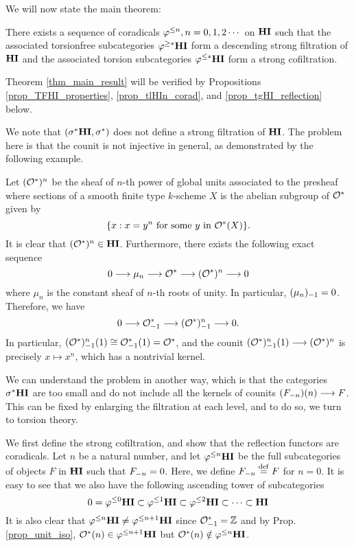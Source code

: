 We will now state the main theorem:

\begin{thm}\label{thm_main_result}
There exists a sequence of coradicals $\tlHI{n}, n = 0, 1, 2 
\cdots$ on $\HI$ such that the associated torsionfree 
subcategories $\tgHI{*}\HI$ form a descending strong filtration
of $\HI$ and the associated torsion subcategories $\tlHI{*}\HI$ 
form a strong cofiltration.
\end{thm}

Theorem \ref{thm_main_result} will be verified by Propositions
\ref{prop_TFHI_properties}, \ref{prop_tlHIn_corad}, and 
\ref{prop_tgHI_reflection} below.

\begin{rmk}\label{rmk_sgHI_is_not_strong_filt}
We note that $(\sgHI{*}\HI, \sgHI{*})$ does not define a strong 
filtration of $\HI$. The problem here is that the counit is not 
injective in general, as demonstrated by the following example.

Let $(\Ox)^n$ be the sheaf of $n$-th power of global units 
associated to the presheaf where sections of a smooth finite type 
$k$-scheme $X$ is the abelian subgroup of $\Ox$ given by 
\[
\{x : x=y^n\textrm{ for some }y \textrm{ in } \Ox(X)\}.
\]
It is clear that $(\Ox)^n \in \HI$. Furthermore, there exists the 
following exact sequence 
\[
0 \to \mu_n \to \Ox \to (\Ox)^n \to 0
\]
where $\mu_n$ is the constant sheaf of $n$-th roots of unity.
In particular, $\RHI{(\mu_n)} = 0$. Therefore, we have
\[
0 \to \RHI{\Ox} \to \RHI{(\Ox)^{n}} \to 0.
\]
In particular, $\LHI{\RHI{(\Ox)^n}} \cong \LHI{\RHI{\Ox}} = \Ox$, 
and the counit $\LHI{\RHI{(\Ox)^n}} \to (\Ox)^n$ is precisely $x 
\mapsto x^n$, which has a nontrivial kernel.

We can understand the problem in another way, which is that the 
categories $\sgHI{*}\HI$ are too small and do not include all
the kernels of counits $\LHI[n]{(\RHI[n]{F})} \to F$. This can be 
fixed by enlarging the filtration at each level, and to do so, we 
turn to torsion theory.
\end{rmk}

We first define the strong cofiltration, and show that the 
reflection functors are coradicals. Let $n$ be a natural number, 
and let $\tlHI{n}\HI$ be the full subcategories of objects $F$ in 
$\HI$ such that $\RHI[n]{F} = 0$. Here, we define $\RHI[n]{F} 
\defeq F$ for $n = 0$. It is easy to see that we also have the 
following ascending tower of subcategories
\[
0 = \tlHI{0}\HI \subset \tlHI{1}\HI \subset \tlHI{2}\HI \subset 
   \cdots \subset \HI
\]
It is also clear that $\tlHI{n}\HI \neq \tlHI{n + 1}\HI$ since 
$\RHI{\Ox} = \Z$ and by Prop. \ref{prop_unit_iso}, $\LHI[n]{\Ox} 
\in \tlHI{n + 1}\HI$ but $\LHI[n]{\Ox} \notin \tlHI{n}\HI$.

